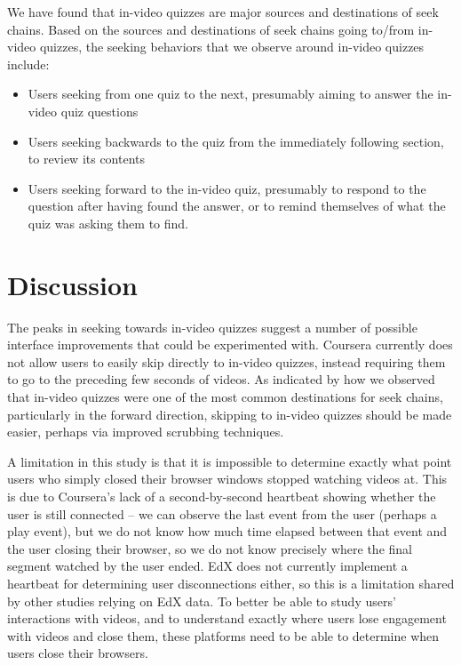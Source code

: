\documentclass{sigchi}
\begin{document}
We have found that in-video quizzes are major sources and destinations of seek chains. Based on the sources and destinations of seek chains going to/from in-video quizzes, the seeking behaviors that we observe around in-video quizzes include:

\begin{itemize}
\item Users seeking from one quiz to the next, presumably aiming to answer the in-video quiz questions
\item Users seeking backwards to the quiz from the immediately following section, to review its contents
\item Users seeking forward to the in-video quiz, presumably to respond to the question after having found the answer, or to remind themselves of what the quiz was asking them to find.
\end{itemize}

\section{Discussion}

The peaks in seeking towards in-video quizzes suggest a number of possible interface improvements that could be experimented with. Coursera currently does not allow users to easily skip directly to in-video quizzes, instead requiring them to go to the preceding few seconds of videos. As indicated by how we observed that in-video quizzes were one of the most common destinations for seek chains, particularly in the forward direction, skipping to in-video quizzes should  be made easier, perhaps via improved scrubbing techniques. %

A limitation in this study is that it is impossible to determine exactly what point users who simply closed their browser windows stopped watching videos at. This is due to Coursera's lack of a second-by-second heartbeat showing whether the user is still connected -- we can observe the last event from the user (perhaps a play event), but we do not know how much time elapsed between that event and the user closing their browser, so we do not know precisely where the final segment watched by the user ended. EdX does not currently implement a heartbeat for determining user disconnections either, so this is a limitation shared by other studies relying on EdX data. To better be able to study users' interactions with videos, and to understand exactly where users lose engagement with videos and close them, these platforms need to be able to determine when users close their browsers.
\end{document}
